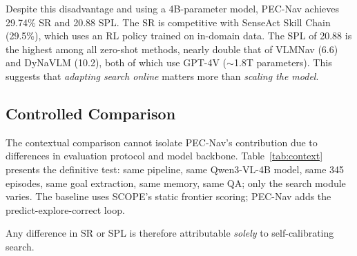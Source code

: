 \documentclass[10pt,twocolumn,letterpaper]{article}
\begin{document}
Despite this disadvantage and using a 4B-parameter model, PEC-Nav achieves 29.74\% SR and 20.88 SPL. The SR is competitive with SenseAct Skill Chain (29.5\%), which uses an RL policy trained on in-domain data. The SPL of 20.88 is the highest among all zero-shot methods, nearly double that of VLMNav (6.6) and DyNaVLM (10.2), both of which use GPT-4V ($\sim$1.8T parameters). This suggests that \emph{adapting search online} matters more than \emph{scaling the model}.

\subsection{Controlled Comparison}

The contextual comparison cannot isolate PEC-Nav's contribution due to differences in evaluation protocol and model backbone. Table~\ref{tab:context} presents the definitive test: same pipeline, same Qwen3-VL-4B model, same 345 episodes, same goal extraction, same memory, same QA; only the search module varies. The baseline uses SCOPE's static frontier scoring; PEC-Nav adds the predict-explore-correct loop.

Any difference in SR or SPL is therefore attributable \emph{solely} to self-calibrating search.
\end{document}
